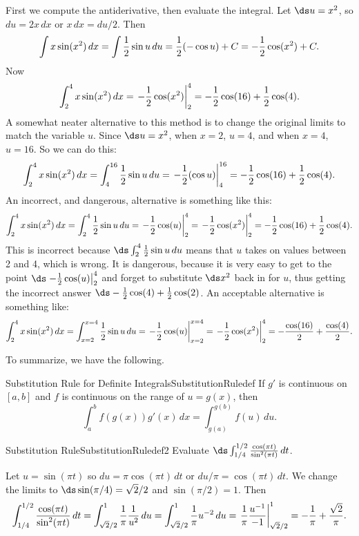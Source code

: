\begin{solution} 
First we compute the
antiderivative, then evaluate the integral.
Let $\ds u=x^2$, so $du=2x\,dx$ or $x\,dx=du/2$. Then
$$
  \int x\sin(x^2)\,dx=\int {1\over 2} \sin u\,du={1\over 2}(-\cos u)+C=
  -{1\over 2}\cos(x^2)+C.
$$
Now
$$
  \int_2^4 x\sin(x^2)\,dx=\left.-{1\over 2}\cos(x^2)\right|_2^4
  =-{1\over 2}\cos(16)+{1\over 2}\cos(4).
$$
A somewhat neater alternative to this method is to change the original
limits to match the variable $u$. Since $\ds u=x^2$, when $x=2$, $u=4$,
and when $x=4$, $u=16$. So we can do this:
$$
  \int_2^4 x\sin(x^2)\,dx=
  \int_4^{16} {1\over 2} \sin u\,du=\left.-{1\over 2}(\cos u)\right|_4^{16}
  =-{1\over 2}\cos(16)+{1\over 2}\cos(4).
$$
An incorrect, and dangerous, alternative is something like this:
$$
  \int_2^4 x\sin(x^2)\,dx=\int_2^4 {1\over 2} \sin u\,du=
  \left.-{1\over 2}\cos (u)\right|_2^4=
  \left.-{1\over 2}\cos(x^2)\right|_2^4=-{1\over 2}\cos(16)+{1\over
  2}\cos(4).
$$
This is incorrect because $\ds\int_2^4 {1\over 2} \sin u\,du$
means that $u$ takes on values between 2 and 4, which is wrong. It
is dangerous, because it is very easy to get to 
the point $\ds\left.-{1\over 2}\cos (u)\right|_2^4$ and forget to substitute
$\ds x^2$ back in for $u$, thus getting the incorrect answer
$\ds -{1\over 2}\cos(4)+{1\over 2}\cos(2)$. An acceptable alternative is something like:
$$ 
  \int_2^4 x\sin(x^2)\,dx=\int_{x=2}^{x=4} {1\over 2} \sin u\,du=
  \left.-{1\over 2}\cos (u)\right|_{x=2}^{x=4}=
  \left.-{1\over 2}\cos(x^2)\right|_2^4=-{\cos(16)\over 2}+{\cos(4)\over2}.
$$
\end{solution}

To summarize, we have the following.

\begin{theorem}{Substitution Rule for Definite Integrals}{SubstitutionRuledef}
If $g'$ is continuous on $[a,b]$ and $f$ is continuous on the range of $u=g(x)$, then
$$\int_a^b f(g(x))g'(x)\,dx=\int_{g(a)}^{g(b)}f(u)\,du.$$
\end{theorem}

\begin{example}{Substitution Rule}{SubstitutionRuledef2}
Evaluate $\ds\int_{1/4}^{1/2}{\cos(\pi t)\over\sin^2(\pi t)}\,dt$. 
\end{example}

\begin{solution} 
Let $u=\sin(\pi t)$ so $du=\pi\cos(\pi t)\,dt$ or $du/\pi=\cos(\pi
t)\,dt$.
We change the limits to $\ds \sin(\pi/4)=\sqrt2/2$ and 
$\sin(\pi/2)=1$.
Then
$$
  \int_{1/4}^{1/2}{\cos(\pi t)\over\sin^2(\pi t)}\,dt=
  \int_{\sqrt2/2}^{1}{1\over \pi}{1\over u^2}\,du=
  \int_{\sqrt2/2}^{1} {1\over \pi}u^{-2}\,du=
  \left.{1\over \pi}{u^{-1}\over -1}\right|_{\sqrt2/2}^{1}=
  -{1\over\pi}+{\sqrt2\over\pi}.
$$
\end{solution}


